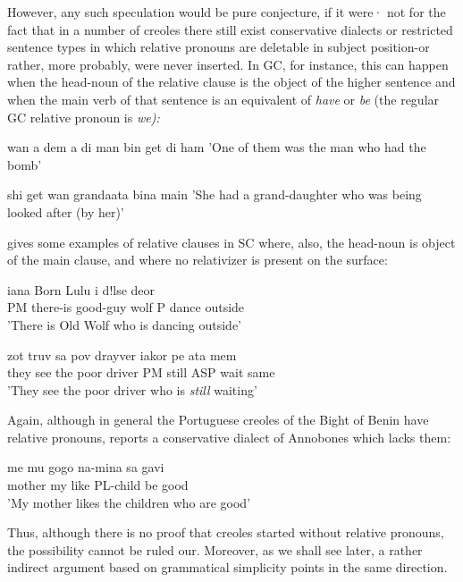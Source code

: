 However, any such speculation would be pure conjecture, if it were· not for the fact that in a number of creoles there still exist conservative dialects or restricted sentence types in which relative pronouns are deletable in subject position-or rather, more probably, were never inserted. In GC, for instance, this can happen when the head-noun of the relative clause is the object of the higher sentence and when the main verb of that sentence is an equivalent of \textit{have} or \textit{be} (the regular GC relative pronoun is \textit{we):}

\ea\label{ex:39}
 wan a dem a di man bin get di ham
\glt'One of them was the man who had the bomb'
\z



\ea\label{ex:40}
 shi get wan grandaata bina main
\glt'She had a grand-daughter who was being looked after (by her)'
\z



\citet[38]{Corne1977} gives some examples of relative clauses in SC where, also, the head-noun is object of the main clause, and where no rela\-tivizer is present on the surface:

\ea\label{ex:41}
\gll  iana Born Lulu i d!lse deor\\
PM there-is good-guy wolf P dance outside \\
\glt'There is Old Wolf who is dancing outside'
\z




\ea\label{ex:42}
\gll zot truv sa pov drayver iakor pe ata mem\\
they see the poor driver PM still ASP wait same\\
\glt 'They see the poor driver who is \textit{still} waiting'
\z



Again, although in general the Portuguese creoles of the Bight of Benin have relative pronouns, \citet[97]{Valkoff1966} reports a conserva\-tive dialect of Annobones which lacks them:

\ea\label{ex:43}
\gll  me mu gogo na-mina sa gavi \\
mother my like PL-child be good\\
\glt'My mother likes the children who are good'
\z



Thus, although there is no proof that creoles started without relative pronouns, the possibility cannot be ruled our. Moreover, as we shall see later, a rather indirect argument based on grammatical sim\-plicity points in the same direction.

